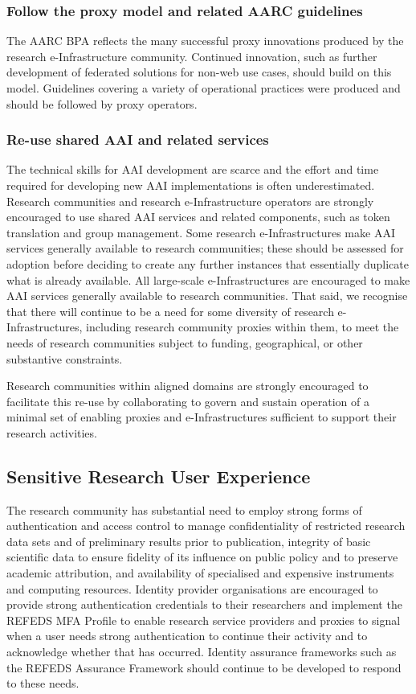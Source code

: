 \documentclass[fleqn,11pt]{wlscirep}
\begin{document}
{\subsubsection{Follow the proxy model and related AARC guidelines}
The AARC BPA reflects the many successful proxy innovations produced by the research e-Infrastructure community. Continued innovation, such as further development of federated solutions for non-web use cases, should build on this model. Guidelines covering a variety of operational practices were produced and should be followed by proxy operators.

\subsubsection{Re-use shared AAI and related services} 
The technical skills for AAI development are scarce and the effort and time required for developing new AAI implementations is often underestimated. Research communities and research e-Infrastructure operators are strongly encouraged to use shared AAI services and related components, such as token translation and group management. Some research e-Infrastructures make AAI services generally available to research communities; these should be assessed for adoption before deciding to create any further instances that essentially duplicate what is already available. All large-scale e-Infrastructures are encouraged to make AAI services generally available to research communities. That said, we recognise that there will continue to be a need for some diversity of research e-Infrastructures, including research community proxies within them, to meet the needs of research communities subject to funding, geographical, or other substantive constraints.

Research communities within aligned domains are strongly encouraged to facilitate this re-use by collaborating to govern and sustain operation of a minimal set of enabling proxies and e-Infrastructures sufficient to support their research activities. 

\subsection{Sensitive Research User Experience}
The research community has substantial need to employ strong forms of authentication and access control to manage confidentiality of restricted research data sets and of preliminary results prior to publication, integrity of basic scientific data to ensure fidelity of its influence on public policy and to preserve academic attribution, and availability of specialised and expensive instruments and computing resources. Identity provider organisations are encouraged to provide strong authentication credentials to their researchers and implement the REFEDS MFA Profile to enable research service providers and proxies to signal when a user needs strong authentication to continue their activity and to acknowledge whether that has occurred. Identity assurance frameworks such as the REFEDS Assurance Framework should continue to be developed to respond to these needs.

}
\end{document}
